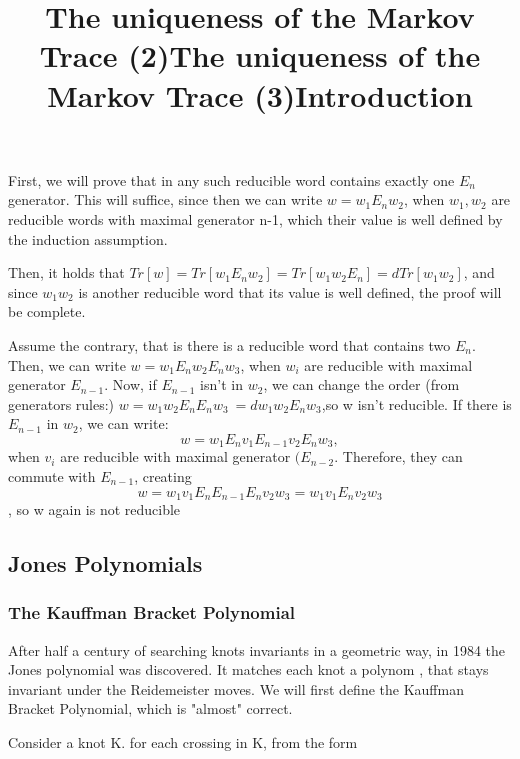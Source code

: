 \documentclass{article}
\begin{document}
\title{The uniqueness of the Markov Trace (2)}
First, we will prove that in any such reducible word contains exactly one $E_{n}$ generator.
This will suffice, since then we can write $w=w_{1}E_{n}w_{2}$, when $w_{1}, w_{2}$ are
reducible words with maximal generator n-1, which their value is well defined by the induction assumption.

Then, it holds that $Tr[w]=Tr[w_{1}E_{n}w_{2}] = Tr[w_{1}w_{2}E_{n}] = dTr[w_{1}w_{2}]$, and
since $w_{1}w_{2}$ is another reducible word that its value is well defined, the proof will be complete.   


\title{The uniqueness of the Markov Trace (3)}
Assume the contrary, that is there is a reducible word that contains two $E_{n}$.
Then, we can write $w=w_{1}E_{n}w_{2}E_{n}w_{3}$, when $w_{i}$ are reducible with maximal generator
$E_{n-1}$. Now, if $E_{n-1}$ isn't in $w_{2}$, we can change the order (from generators rules:)
$w=w_{1}w_{2}E_{n}E_{n}w_{3}\ = dw_{1}w_{2}E_{n}w_{3}$,so w isn't reducible.
If there is $E_{n-1}$ in  $w_{2}$, we can write:
\begin{displaymath}
 w=w_{1}E_{n}v_{1}E_{n-1}v_{2}E_{n}w_{3},
 \end{displaymath} 
 when 
 $v_{i}$  are reducible with maximal generator
$(E_{n-2}$. Therefore, they can commute with $E_{n-1}$, creating 
\begin{displaymath}
w=w_{1}v_{1}E_{n}E_{n-1}E_{n}v_{2}w_{3}
= w_{1}v_{1}E_{n}v_{2}w_{3}
 \end{displaymath} 
 , so w again is not reducible
   



\subsection{Jones Polynomials} 
\subsubsection{The Kauffman Bracket Polynomial}
\title{Introduction}
After half a century of searching knots invariants in a geometric way, in 1984 the Jones polynomial
was discovered. It matches each knot a polynom , that stays invariant under the Reidemeister moves.
We will first define the Kauffman Bracket Polynomial, which is "almost" correct.

Consider a knot K. for each crossing in K, from the form 
\begin{center}
\end{center} 
\end{document}

